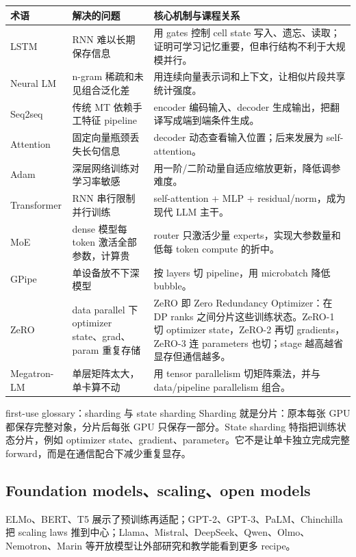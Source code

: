 \documentclass[a4paper]{article}
\begin{document}
\begin{longtable}{p{}p{}p{}}
\toprule
\textbf{术语} & \textbf{解决的问题} & \textbf{核心机制与课程关系} \\
\midrule
LSTM & RNN 难以长期保存信息 & 用 gates 控制 cell state 写入、遗忘、读取；证明可学习记忆重要，但串行结构不利于大规模并行。 \\
Neural LM & n-gram 稀疏和未见组合泛化差 & 用连续向量表示词和上下文，让相似片段共享统计强度。 \\
Seq2seq & 传统 MT 依赖手工特征 pipeline & encoder 编码输入、decoder 生成输出，把翻译写成端到端条件生成。 \\
Attention & 固定向量瓶颈丢失长句信息 & decoder 动态查看输入位置；后来发展为 self-attention。 \\
Adam & 深层网络训练对学习率敏感 & 用一阶/二阶动量自适应缩放更新，降低调参难度。 \\
Transformer & RNN 串行限制并行训练 & self-attention + MLP + residual/norm，成为现代 LLM 主干。 \\
MoE & dense 模型每 token 激活全部参数，计算贵 & router 只激活少量 experts，实现大参数量和低每 token compute 的折中。 \\
GPipe & 单设备放不下深模型 & 按 layers 切 pipeline，用 microbatch 降低 bubble。 \\
ZeRO & data parallel 下 optimizer state、grad、param 重复存储 & ZeRO 即 Zero Redundancy Optimizer：在 DP ranks 之间分片这些训练状态。ZeRO-1 切 optimizer state，ZeRO-2 再切 gradients，ZeRO-3 连 parameters 也切；stage 越高越省显存但通信越多。 \\
Megatron-LM & 单层矩阵太大，单卡算不动 & 用 tensor parallelism 切矩阵乘法，并与 data/pipeline parallelism 组合。 \\
\bottomrule
\end{longtable}

\begin{knowledgebox}{first-use glossary：sharding 与 state sharding}
Sharding 就是分片：原本每张 GPU 都保存完整对象，分片后每张 GPU 只保存一部分。State sharding 特指把训练状态分片，例如 optimizer state、gradient、parameter。它不是让单卡独立完成完整 forward，而是在通信配合下减少重复显存。
\end{knowledgebox}

\subsection{Foundation models、scaling、open models}

ELMo、BERT、T5 展示了预训练再适配；GPT-2、GPT-3、PaLM、Chinchilla 把 scaling laws 推到中心；Llama、Mistral、DeepSeek、Qwen、Olmo、Nemotron、Marin 等开放模型让外部研究和教学能看到更多 recipe。
\end{document}
